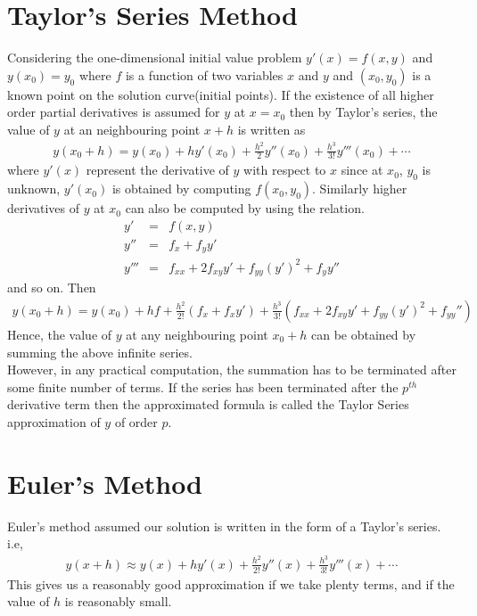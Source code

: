 \documentclass[11pt]{report}
\newcommand{\sps}{\\[0.2cm]}
\newcommand{\sprime}{'}
\newcommand{\dprime}{''}
\newcommand{\tprime}{'''}
\begin{document}
	\section{Taylor's Series Method}
	Considering the one-dimensional initial value problem $y\sprime(x) = f(x,y)$ and $y(x_0)=y_0$ where $f$ is a function of two variables $x$ and $y$ and $(x_0,y_0)$ is a known point on the solution curve(initial points). If the existence of all higher order partial derivatives is assumed for $y$ at $x=x_0$ then by Taylor's series, the value of $y$ at an neighbouring point $x+h$ is written as
	\begin{eqnarray}
		y(x_0+h) = y(x_0) + hy\sprime(x_0) + \frac{h^2}{2}y\dprime(x_0) + \frac{h^3}{3!}y\tprime(x_0) + \cdots
	\end{eqnarray}
	where $y\sprime(x)$ represent the derivative of $y$ with respect to $x$ since at $x_0$, $y_0$ is unknown, $y\sprime(x_0)$ is obtained by computing $f(x_0,y_0)$. Similarly higher derivatives of $y$ at $x_0$ can also be computed by using the relation.
	\begin{eqnarray}
		y\sprime &=& f(x,y)\sps
		y\dprime &=& f_x + f_y y\sprime\sps
		y\tprime &=& f_{xx} + 2f_{xy}y\sprime + f_{yy}(y\sprime)^2 + f_y y\dprime 
	\end{eqnarray}
	and so on. Then
	\begin{eqnarray}
		y(x_0+h) = y(x_0) + hf + \frac{h^2}{2!}(f_x + f_x y\sprime) + \frac{h^3}{3!}(f_{xx} + 2f_{xy}y\prime + f_{yy}(y\sprime)^2 + f_{yy}\dprime)
	\end{eqnarray}
	Hence, the value of $y$ at any neighbouring point $x_0+h$ can be obtained by summing the above infinite series.\\
	However, in any practical computation, the summation has to be terminated after some finite number of terms. If the series has been terminated after the $p^{th}$ derivative term then the approximated formula is called the Taylor Series approximation of $y$ of order $p$.
	
	\section{Euler's Method}
	Euler's method assumed our solution is written in the form of a Taylor's series. i.e,
	\begin{eqnarray}
		y(x+h) \approx y(x) + hy\sprime(x) + \frac{h^2}{2!}y\dprime(x) + \frac{h^3}{3!}y\tprime(x) + \cdots
	\end{eqnarray}
	This gives us a reasonably good approximation if we take plenty terms, and if the value of $h$ is reasonably small. \\
	
\end{document}
